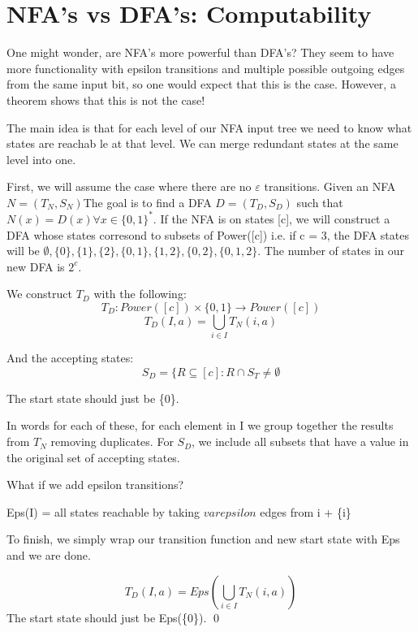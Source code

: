 \section{NFA's vs DFA's: Computability}
One might wonder, are NFA's more powerful than DFA's? They seem to have more functionality with epsilon transitions and multiple possible outgoing edges from the same input bit, so one would expect that this is the case. However, a  theorem shows that this is not the case! 

{
    The main idea is that for each level of our NFA input tree we need to know what states are reachab le at that level. We can merge redundant states at the same level into one. 

    First, we will assume the case where there are no $\varepsilon$ transitions. Given an NFA $N = (T_N, S_N)$The goal is to find a DFA $D = (T_D, S_D)$ such that $N(x) = D(x) \forall x \in \{0,1\}^*$. If the NFA is on states [c], we will construct a DFA whose states corresond to subsets of Power([c]) i.e. if c = 3, the DFA states will be $\emptyset, \{0\}, \{1\}, \{2\}, \{0, 1\}, \{1, 2\}, \{0, 2\}, \{0, 1, 2\}$. The number of states in our new DFA is $2^c$.

    We construct $T_D$ with the following: 
    $$ T_D: Power([c]) \times \{0,1\} \rightarrow Power([c])$$
    $$ T_D(I, a) = \bigcup_{i \in I}T_N(i, a) $$

    And the accepting states:
    $$ S_D = \{ R \subseteq [c]: R \cap S_T \neq \emptyset $$

    The start state should just be \{0\}.

    In words for each of these, for each element in I we group together the results from $T_N$ removing duplicates. For $S_D$, we include all subsets that have a value in the original set of accepting states.

    \hr 

    What if we add epsilon transitions?

    \begin{definition}
        Eps(I) = all states reachable by taking $varepsilon$ edges from i + \{i\}
    \end{definition}

    To finish, we simply wrap our transition function and new start state with Eps and we are done.

    $$ T_D(I, a) = Eps(\bigcup_{i \in I}T_N(i, a)) $$
    The start state should just be Eps(\{0\}).
    \qed
}

